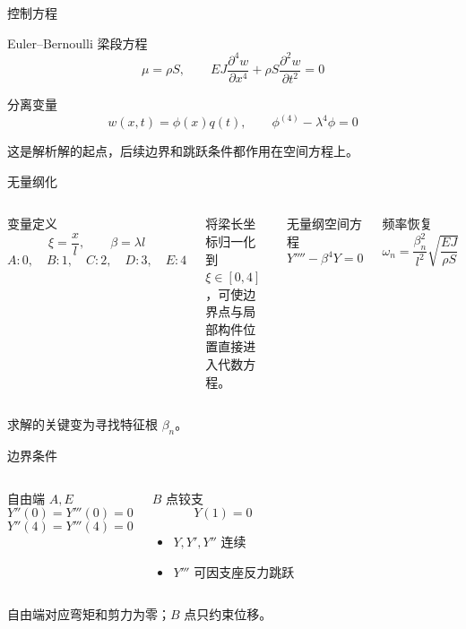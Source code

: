 \documentclass[UTF8,aspectratio=169,10pt]{ctexbeamer}
\newcommand{\takeaway}[1]{\vfill{\small\color{tjublue}#1}}
\begin{document}
\begin{frame}{控制方程}
  \begin{block}{Euler--Bernoulli 梁段方程}
    \[
    \mu=\rho S,\qquad
    EJ\frac{\partial^4 w}{\partial x^4}
    +\rho S\frac{\partial^2 w}{\partial t^2}=0
    \]
  \end{block}
  \begin{block}{分离变量}
    \[
    w(x,t)=\phi(x)q(t),
    \qquad
    \phi^{(4)}-\lambda^4\phi=0
    \]
  \end{block}
  \takeaway{这是解析解的起点，后续边界和跳跃条件都作用在空间方程上。}
\end{frame}

\begin{frame}{无量纲化}
  \vspace{0.2em}
  \begin{columns}[c,onlytextwidth]
    \begin{block}{变量定义}
      \[
      \xi=\frac{x}{l},\qquad \beta=\lambda l
      \]
      \vspace{-0.4em}
      \[
      A:0,\quad B:1,\quad C:2,\quad D:3,\quad E:4
      \]
    \end{block}
    \vspace{0.5em}
    \begin{center}
      \small
      将梁长坐标归一化到 $\xi\in[0,4]$，可使边界点与局部构件位置直接进入代数方程。
    \end{center}
    \begin{block}{无量纲空间方程}
      \[
      Y''''-\beta^4Y=0
      \]
    \end{block}
    \vspace{0.6em}
    \begin{block}{频率恢复}
      \[
      \omega_n=
      \frac{\beta_n^2}{l^2}
      \sqrt{\frac{EJ}{\rho S}}
      \]
    \end{block}
  \end{columns}
  \vspace{0.8em}
  \takeaway{求解的关键变为寻找特征根 $\beta_n$。}
\end{frame}

\begin{frame}{边界条件}
  \begin{columns}[T,onlytextwidth]
    \begin{block}{自由端 $A,E$}
      \[
      Y''(0)=Y'''(0)=0
      \]
      \[
      Y''(4)=Y'''(4)=0
      \]
    \end{block}
    \begin{block}{$B$ 点铰支}
      \[
      Y(1)=0
      \]
      \begin{itemize}
        \item $Y,Y',Y''$ 连续
        \item $Y'''$ 可因支座反力跳跃
      \end{itemize}
    \end{block}
  \end{columns}
  \takeaway{自由端对应弯矩和剪力为零；$B$ 点只约束位移。}
\end{frame}
\end{document}
